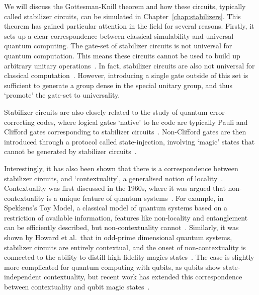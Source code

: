 We will discuss the Gottesman-Knill theorem and how these circuits, typically called stabilizer circuits, can be simulated in Chapter~\ref{chap:stabilizers}. This theorem has gained particular attention in the field for several reasons. Firstly, it sets up a clear correspondence between classical simulability and universal quantum computing. The gate-set of stabilizer circuits is not universal for quantum computation. This means these circuits cannot be used to build up arbitrary unitary operations~\cite{Nielsen2000}. In fact, stabilizer circuits are also not universal for classical computation~\cite{Aaronson2004}. However, introducing a single gate outside of this set is sufficient to generate a group dense in the special unitary group, and thus `promote' the gate-set to universality.\par
Stabilizer circuits are also closely related to the study of quantum error-correcting codes, where logical gates `native' to he code are typically Pauli and Clifford gates corresponding to stabilizer circuits~\cite{Nielsen2000}. Non-Clifford gates are then introduced through a protocol called state-injection, involving `magic' states that cannot be generated by stabilizer circuits~\cite{Gottesman1999,Bravyi2005}.\par
Interestingly, it has also been shown that there is a correspondence between stabilizer circuits, and `contextuality', a generalised notion of locality~\cite{Howard2014}. Contextuality was first discussed in the 1960s, where it was argued that non-contextuality is a unique feature of quantum systems~\cite{Bell1966,Kochen1967}. For example, in Spekkens's Toy Model, a classical model of quantum systems based on a restriction of available information, features like non-locality and entanglement can be efficiently described, but non-contextuality cannot~\cite{Kochen1967}. Similarly, it was shown by Howard et al.\ that in odd-prime dimensional quantum systems, stabilizer circuits are entirely contextual, and the onset of non-contextuality is connected to the ability to distill high-fidelity magics states~\cite{Howard2014}. The case is slightly more complicated for quantum computing with qubits, as qubits show state-independent contextuality, but recent work has extended this correspondence between contextuality and qubit magic states~\cite{BermejoVega2017}.
